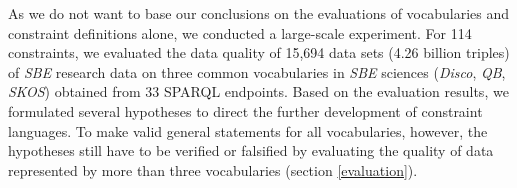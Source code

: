 \documentclass{llncs}
\begin{document}
As we do not want to base our conclusions on the evaluations of vocabularies and constraint definitions alone, we conducted a large-scale experiment.
For 114 constraints, we evaluated the data quality of 15,694 data sets (4.26 billion triples) of \emph{SBE} research data on three common vocabularies in \emph{SBE} sciences (\emph{Disco}, \emph{QB}, \emph{SKOS}) obtained from 33 SPARQL endpoints.
Based on the evaluation results,
we formulated several hypotheses to direct the further development of constraint languages.
To make valid general statements for all vocabularies, however,
the hypotheses still have to be verified or falsified
by evaluating the quality of data represented by more than three vocabularies (section \ref{evaluation}).
\end{document}
